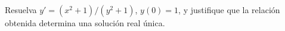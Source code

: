 Resuelva $y'=(x^2+1)/(y^2+1)$, $y(0)=1$, y justifique que la relación obtenida determina una solución real única.
